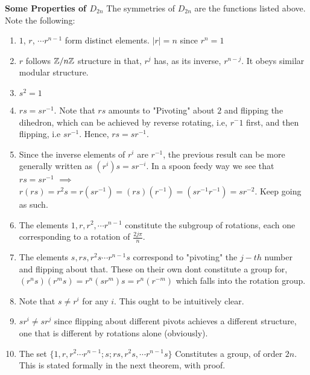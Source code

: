 \documentclass[../Main.tex]{subfiles}
\begin{document}
\textbf{Some Properties of $D_{2n}$}
The symmetries of $D_{2n}$ are the functions listed above. Note the following:
\begin{enumerate}
    \item $1$, $r$, $\cdots r^{n-1}$ form distinct elements. $|r|=n$ since $r^n=1$
    \item $r$ follows $\mathbb Z /n \mathbb Z$ structure in that, $r^{j}$ has, as its inverse, $r^{n-j}$. It obeys similar modular structure.
    \item $s^2=1$
    \item $rs=sr^{-1}$. Note that $rs$ amounts to "Pivoting" about $2$ and flipping the dihedron, which can be achieved by reverse rotating, i.e, $r^-1$ first, and then flipping, i.e $sr^{-1}$. Hence, $rs=sr^{-1}$.
    \item Since the inverse elements of $r^i$ are $r^{-1}$, the previous result can be more generally written as $(r^i)s=sr^{-i}$. In a spoon feedy way we see that $rs=sr^{-1}$ $\implies$ $r(rs)=r^2s=r(sr^{-1})=(rs)(r^{-1})=(sr^{-1}r^{-1})=sr^{-2}$. Keep going as such.
    \item The elements $1,r,r^2, \cdots r^{n-1}$ constitute the subgroup of rotations, each one corresponding to a rotation of $\frac{2j\pi}{n}$.
    \item The elements $s, rs, r^2s \cdots r^{n-1}s$ correspond to "pivoting" the $j-th$ number and flipping about that. These on their own dont constitute a group for, $(r^ns)(r^ms)=r^n(sr^m)s=r^n(r^{-m})$ which falls into the rotation group. 
    \item Note that $s \neq r^{i}$ for any $i$. This ought to be intuitively clear.
    \item $sr^{i}\neq sr^{j}$ since flipping about different pivots achieves a different structure, one that is different by rotations alone (obviously).
    \item The set $\{1,r,r^2 \cdots r^{n-1}; s; rs,r^2s, \cdots r^{n-1}s\}$ Constitutes a group, of order $2n$. This is stated formally in the next theorem, with proof.  
\end{enumerate}

\end{document}
